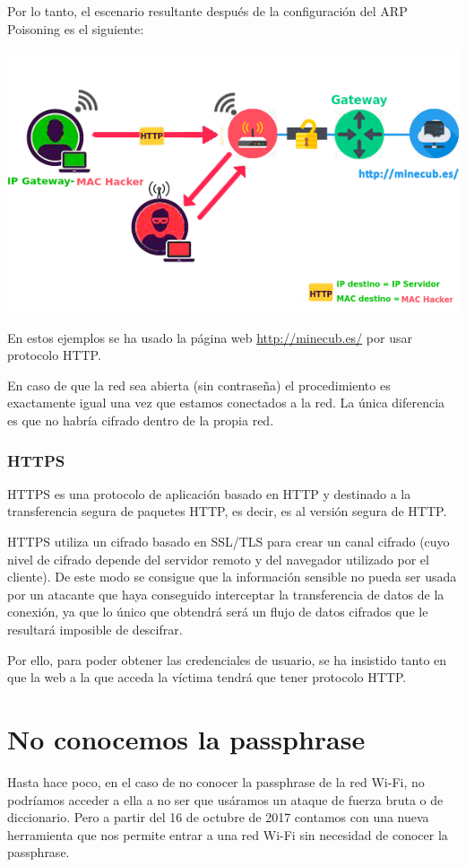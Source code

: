 Por lo tanto, el escenario resultante después de la configuración del ARP Poisoning es el siguiente:
\begin{center}
	\includegraphics[scale=0.7]{Escenario.png}
\end{center}

\Nota En estos ejemplos se ha usado la página web \url{http://minecub.es/} por usar protocolo HTTP.

\Nota En caso de que la red sea abierta (sin contraseña) el procedimiento es exactamente igual una vez que estamos conectados a la red. La única diferencia es que no habría cifrado dentro de la propia red.

\subsubsection{HTTPS}
HTTPS es una protocolo de aplicación basado en HTTP y destinado a la transferencia segura de paquetes HTTP, es decir, es al versión segura de HTTP.

HTTPS utiliza un cifrado basado en SSL/TLS para crear un canal cifrado (cuyo nivel de cifrado depende del servidor remoto y del navegador utilizado por el cliente). De este modo se consigue que la información sensible no pueda ser usada por un atacante que haya conseguido interceptar la transferencia de datos de la conexión, ya que lo único que obtendrá será un flujo de datos cifrados que le resultará imposible de descifrar.

Por ello, para poder obtener las credenciales de usuario, se ha insistido tanto en que la web a la que acceda la víctima tendrá que tener protocolo HTTP.

\section{No conocemos la passphrase}
Hasta hace poco, en el caso de no conocer la passphrase de la red Wi-Fi, no podríamos acceder a ella a no ser que usáramos un ataque de fuerza bruta o de diccionario. Pero a partir del 16 de octubre de 2017 contamos con una nueva herramienta que nos permite entrar a una red Wi-Fi sin necesidad de conocer la passphrase.

